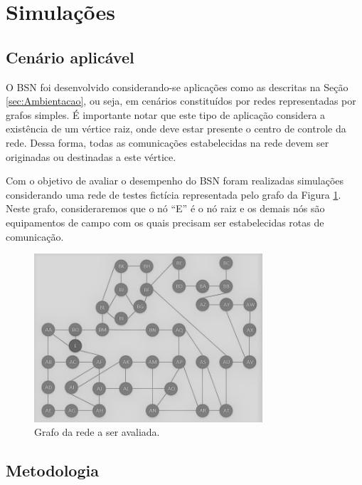 \documentclass[12pt]{article}
\begin{document}
\section{Simulações}
\subsection{Cenário aplicável}
O BSN foi desenvolvido considerando-se aplicações como as descritas na Seção \ref{sec:Ambientacao}, ou seja, em cenários constituídos por redes representadas por grafos simples. É importante notar que este tipo de aplicação considera a existência de um vértice raiz, onde deve estar presente o centro de controle da rede. Dessa forma, todas as comunicações estabelecidas na rede devem ser originadas ou destinadas a este vértice.

Com o objetivo de avaliar o desempenho do BSN foram realizadas simulações considerando uma rede de testes fictícia representada pelo grafo da Figura \ref{fig_rede_estudo}. Neste grafo, consideraremos que o nó ``E'' é o nó raiz e os demais nós são equipamentos de campo com os quais precisam ser estabelecidas rotas de comunicação.

\begin{figure} %
	\centering
	\includegraphics[width=8.5cm]{Rede_Estudo_PB}
	\caption{Grafo da rede a ser avaliada.}
	\label{fig_rede_estudo}
\end{figure}

\subsection{Metodologia}
\end{document}
